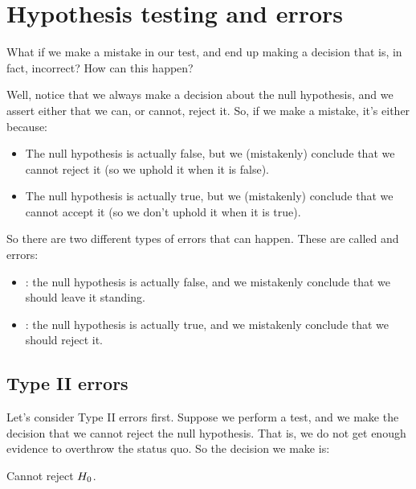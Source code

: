 \documentclass[../../../main.tex]{subfiles}
\begin{document}
\chapter{Hypothesis testing and errors}

What if we make a mistake in our test, and end up making a decision that is, in fact, incorrect? How can this happen?

Well, notice that we always make a decision about the null hypothesis, and we assert either that we can, or cannot, reject it. So, if we make a mistake, it's either because: 

\begin{itemize}
  \item The null hypothesis is actually false, but we (mistakenly) conclude that we cannot reject it (so we uphold it when it is false).
  \item The null hypothesis is actually true, but we (mistakenly) conclude that we cannot accept it (so we don't uphold it when it is true).
\end{itemize}

\noindent
So there are two different types of errors that can happen. These are called  and  errors:

\begin{itemize}
  \item {}: the null hypothesis is actually false, and we mistakenly conclude that we should leave it standing.
  \item {}: the null hypothesis is actually true, and we mistakenly conclude that we should reject it.
\end{itemize}


\section{Type II errors}

Let's consider Type II errors first. Suppose we perform a test, and we make the decision that we cannot reject the null hypothesis. That is, we do not get enough evidence to overthrow the status quo. So the decision we make is:

\begin{center}
  Cannot reject $\NullHyp/$.
\end{center}
\end{document}
